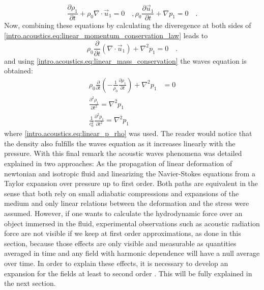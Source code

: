 \begin{subequations}\label{intro.acoustics.eq:linear_NSE_eqs}
\begin{equation}\label{intro.acoustics.eq:linear_mass_conservation}
    \frac{\partial\rho_1}{\partial t} + \rho_0\nabla\cdot\vec u_1 = 0\quad,
\end{equation}    
\begin{equation}\label{intro.acoustics.eq:linear_momentum_conservation_law}
    \rho_0\frac{\partial\vec u_1}{\partial t} +\nabla p_1 = 0\quad.
\end{equation}
\end{subequations}
Now, combining these equations by calculating the diveregence at both sides of \ref{intro.acoustics.eq:linear_momentum_conservation_law} leads to
\begin{equation}
    \rho_0\frac{\partial}{\partial t}(\nabla\cdot\vec u_1) +\nabla^2 p_1 = 0\quad.
\end{equation}
and using \ref{intro.acoustics.eq:linear_mass_conservation} the waves equation is obtained:
\begin{align}
    \rho_0\frac{\partial}{\partial t}\left(-\frac{1}{\rho_0}\frac{\partial\rho_1}{\partial t}\right) +\nabla^2 p_1 &= 0 \nonumber\\
    \frac{\partial^2\rho_1}{\partial t^2} = \nabla^2 p_1\nonumber\\
    \frac{1}{c_0^2}\frac{\partial^2p_1}{\partial t^2} = \nabla^2 p_1\label{intro.acoustics.eq:waves_eq_from_NSE}
\end{align}
where \ref{intro.acoustics.eq:linear_p_rho} was used. The reader would notice that the density also fulfills the waves equation as it increases linearly with the pressure. With this final remark the acoustic waves phenomena was detailed explained in two approaches: As the propagation of linear deformation of newtonian and isotropic fluid and linearizing the Navier-Stokes equations from a Taylor expansion over pressure up to first order. Both paths are equivalent in the sense that both rely on small adiabatic compressions and expansions of the medium and only linear relations between the deformation and the stress were assumed. However, if one wants to calculate the hydrodynamic force over an object immersed in the fluid, experimental observations such as acoustic radiation force are not visible if we keep at first order approximations, as done in this section, because those effects are only visible and measurable as quantities averaged in time and any field with harmonic dependence will have a null average over time. In order to explain these effects, it is necessary to develop an expansion for the fields at least to second order \cite[sec.~III]{Bruus2012_02}. This will be fully explained in the next section. 

